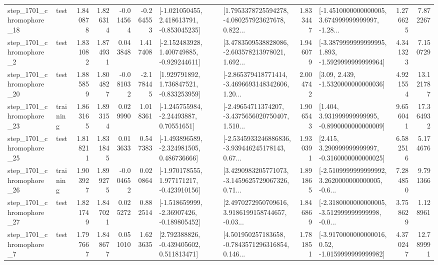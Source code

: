 \begin{tabular}{llrrrrllrlrr}
 step\_1701\_chromophore\_18 &      test &      1.840878 &    1.826314 &     -0.014564 & -0.264553 &   [-1.021050455, 2.418613791, -0.853045235] &  [1.7953378725594278, -4.080257923627678, 0.822... &       1.833447 &  [-1.4510000000000005, 3.674999999999997, -1.28... &            1.276625 &          7.872267 \\
  step\_1701\_chromophore\_2 &      test &      1.831082 &    1.874931 &      0.043848 &  1.417408 &   [-2.152483928, 1.400749885, -0.929244611] &  [3.4783509538828086, -2.603578213978021, 1.692... &       1.946079 &  [-3.3879999999999995, 1.893, -1.5929999999999964] &            4.341323 &          7.150729 \\
 step\_1701\_chromophore\_20 &      test &      1.885859 &    1.804827 &     -0.081032 & -2.178445 &    [1.929791892, 1.736847521, -0.833253959] &  [-2.865379418771414, -3.4696693148342606, 1.20... &       2.004742 &                 [3.09, 2.439, -1.5320000000000036] &            4.921554 &         13.121787 \\
 step\_1701\_chromophore\_23 &  training &      1.863165 &    1.893154 &      0.029990 &  1.018361 &     [-1.245755984, -2.24493887, 0.70551651] &  [-2.49654711374207, -3.4375656020750407, 1.510... &       1.906543 &    [1.404, 3.931999999999995, -0.8990000000000009] &            9.656041 &         17.364932 \\
 step\_1701\_chromophore\_25 &      test &      1.818211 &    1.831845 &      0.013633 &  0.547383 &   [-1.493896589, -2.324981505, 0.486736666] &  [-2.5345933246886836, -3.939446245178143, 0.67... &       1.930391 &    [2.415, 3.290999999999997, -0.3160000000000025] &            6.582516 &          5.174676 \\
 step\_1701\_chromophore\_26 &  training &      1.903927 &    1.899275 &     -0.004652 &  0.020864 &   [-1.970178555, 1.977171217, -0.423910156] &  [3.4290983205771073, -3.1459625729067326, 0.71... &       1.891865 &  [-2.5109999999999992, 3.2620000000000005, -0.6... &            7.284850 &          9.791366 \\
 step\_1701\_chromophore\_27 &      test &      1.821749 &    1.847021 &      0.025272 &  0.882514 &   [-1.518659999, -2.36907426, -0.189805452] &  [2.4970272950709616, 3.9186199158744657, -0.03... &       1.846869 &  [-2.3180000000000005, -3.512999999999998, -0.0... &            3.758629 &          1.128961 \\
  step\_1701\_chromophore\_7 &      test &      1.797667 &    1.848677 &      0.051010 &  1.623635 &    [2.792388826, -0.439405602, 0.511813471] &  [4.501950257183658, -0.7843571296316854, 0.146... &       1.781851 &   [-3.9170000000000016, 0.52, -1.0159999999999982] &            4.370247 &         12.789991 \\

\end{tabular}
